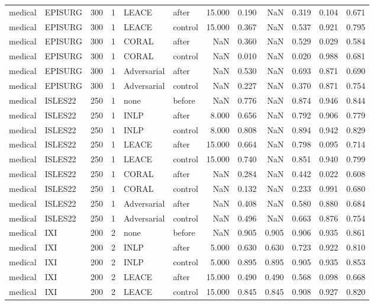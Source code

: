 \begin{tabular}{llrrllrrrrrr}
medical & EPISURG & 300 & 1 & LEACE & after & 15.000 & 0.190 & NaN & 0.319 & 0.104 & 0.671 \\
medical & EPISURG & 300 & 1 & LEACE & control & 15.000 & 0.367 & NaN & 0.537 & 0.921 & 0.795 \\
medical & EPISURG & 300 & 1 & CORAL & after & NaN & 0.360 & NaN & 0.529 & 0.029 & 0.584 \\
medical & EPISURG & 300 & 1 & CORAL & control & NaN & 0.010 & NaN & 0.020 & 0.988 & 0.681 \\
medical & EPISURG & 300 & 1 & Adversarial & after & NaN & 0.530 & NaN & 0.693 & 0.871 & 0.690 \\
medical & EPISURG & 300 & 1 & Adversarial & control & NaN & 0.227 & NaN & 0.370 & 0.871 & 0.754 \\
medical & ISLES22 & 250 & 1 & none & before & NaN & 0.776 & NaN & 0.874 & 0.946 & 0.844 \\
medical & ISLES22 & 250 & 1 & INLP & after & 8.000 & 0.656 & NaN & 0.792 & 0.906 & 0.779 \\
medical & ISLES22 & 250 & 1 & INLP & control & 8.000 & 0.808 & NaN & 0.894 & 0.942 & 0.829 \\
medical & ISLES22 & 250 & 1 & LEACE & after & 15.000 & 0.664 & NaN & 0.798 & 0.095 & 0.714 \\
medical & ISLES22 & 250 & 1 & LEACE & control & 15.000 & 0.740 & NaN & 0.851 & 0.940 & 0.799 \\
medical & ISLES22 & 250 & 1 & CORAL & after & NaN & 0.284 & NaN & 0.442 & 0.022 & 0.608 \\
medical & ISLES22 & 250 & 1 & CORAL & control & NaN & 0.132 & NaN & 0.233 & 0.991 & 0.680 \\
medical & ISLES22 & 250 & 1 & Adversarial & after & NaN & 0.408 & NaN & 0.580 & 0.880 & 0.684 \\
medical & ISLES22 & 250 & 1 & Adversarial & control & NaN & 0.496 & NaN & 0.663 & 0.876 & 0.754 \\
medical & IXI & 200 & 2 & none & before & NaN & 0.905 & 0.905 & 0.906 & 0.935 & 0.861 \\
medical & IXI & 200 & 2 & INLP & after & 5.000 & 0.630 & 0.630 & 0.723 & 0.922 & 0.810 \\
medical & IXI & 200 & 2 & INLP & control & 5.000 & 0.895 & 0.895 & 0.905 & 0.935 & 0.853 \\
medical & IXI & 200 & 2 & LEACE & after & 15.000 & 0.490 & 0.490 & 0.568 & 0.098 & 0.668 \\
medical & IXI & 200 & 2 & LEACE & control & 15.000 & 0.845 & 0.845 & 0.908 & 0.927 & 0.820 \\

\end{tabular}
